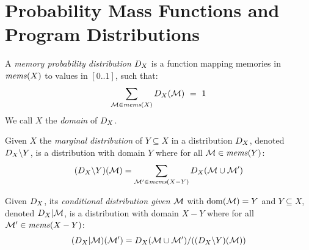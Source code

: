 \section{Probability Mass Functions and Program Distributions}

\begin{definition}
  A \emph{memory probability distribution} $D_{X}$ is a function mapping
  memories in $\mathit{mems}(X)$ to values in $[0..1]$, such that:
  $$
  \sum_{\mathcal{M} \in \mathit{mems}(X)} D_{X}(\mathcal{M}) \  = \ 1
  $$
  We call $X$ the \emph{domain} of $D_{X}$.
\end{definition}

\begin{definition}
  Given $X$ the \emph{marginal distribution} of $Y \subseteq X$
  in a distribution $D_{X}$, denoted $D_{X}\backslash Y$,
  is a distribution with domain $Y$ where for all
  $\mathcal{M} \in \mathit{mems}(Y)$:
  $$
  (D_{X}\backslash Y)(\mathcal{M}) =
  \sum_{\mathcal{M}' \in \mathit{mems}(X-Y)} D_{X}(\mathcal{M} \cup \mathcal{M}')
  $$
\end{definition}

\begin{definition}
  Given $D_{X}$, its \emph{conditional distribution given
  $\mathcal{M}$} with $\mathrm{dom}(\mathcal{M}) = Y$ and $Y \subseteq X$, denoted
  $D_{X}|\mathcal{M}$, is a distribution with domain $X - Y$ where for all
  $\mathcal{M}' \in \mathit{mems}(X - Y)$:
  $$
  (D_{X}|\mathcal{M})(\mathcal{M}') =
      D_{X}(\mathcal{M} \cup \mathcal{M}') / ((D_{X}\backslash Y)(\mathcal{M}))
  $$
\end{definition}

